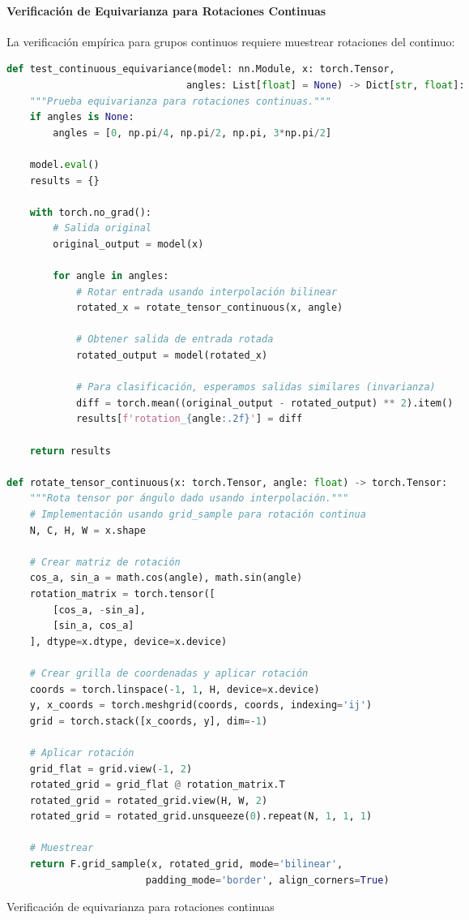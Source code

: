 \paragraph{Verificación de Equivarianza para Rotaciones Continuas}

La verificación empírica para grupos continuos requiere muestrear rotaciones del continuo:

\begin{listing}[h]
\begin{lstlisting}[language=Python]
def test_continuous_equivariance(model: nn.Module, x: torch.Tensor,
                               angles: List[float] = None) -> Dict[str, float]:
    """Prueba equivarianza para rotaciones continuas."""
    if angles is None:
        angles = [0, np.pi/4, np.pi/2, np.pi, 3*np.pi/2]
    
    model.eval()
    results = {}
    
    with torch.no_grad():
        # Salida original
        original_output = model(x)
        
        for angle in angles:
            # Rotar entrada usando interpolación bilinear
            rotated_x = rotate_tensor_continuous(x, angle)
            
            # Obtener salida de entrada rotada
            rotated_output = model(rotated_x)
            
            # Para clasificación, esperamos salidas similares (invarianza)
            diff = torch.mean((original_output - rotated_output) ** 2).item()
            results[f'rotation_{angle:.2f}'] = diff
    
    return results

def rotate_tensor_continuous(x: torch.Tensor, angle: float) -> torch.Tensor:
    """Rota tensor por ángulo dado usando interpolación."""
    # Implementación usando grid_sample para rotación continua
    N, C, H, W = x.shape
    
    # Crear matriz de rotación
    cos_a, sin_a = math.cos(angle), math.sin(angle)
    rotation_matrix = torch.tensor([
        [cos_a, -sin_a],
        [sin_a, cos_a]
    ], dtype=x.dtype, device=x.device)
    
    # Crear grilla de coordenadas y aplicar rotación
    coords = torch.linspace(-1, 1, H, device=x.device)
    y, x_coords = torch.meshgrid(coords, coords, indexing='ij')
    grid = torch.stack([x_coords, y], dim=-1)
    
    # Aplicar rotación
    grid_flat = grid.view(-1, 2)
    rotated_grid = grid_flat @ rotation_matrix.T
    rotated_grid = rotated_grid.view(H, W, 2)
    rotated_grid = rotated_grid.unsqueeze(0).repeat(N, 1, 1, 1)
    
    # Muestrear
    return F.grid_sample(x, rotated_grid, mode='bilinear', 
                        padding_mode='border', align_corners=True)
\end{lstlisting}
\caption{Verificación de equivarianza para rotaciones continuas}
\label{code:continuous_equivariance_test}
\end{listing}

